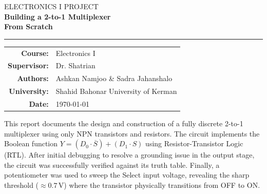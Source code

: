 \documentclass[11pt,a4paper]{article}
\begin{document}
\begin{titlepage}
\begin{center}

\vspace*{1.5cm}

{\Large\sffamily\textcolor{secondary}{ELECTRONICS I PROJECT}}\\[1cm]

{\Huge\bfseries\textcolor{primary}{Building a 2-to-1 Multiplexer}}\\[0.25cm]
{\Huge\bfseries\textcolor{primary}{From Scratch }}\\[0.25cm]

\vspace{1.2cm}

\textcolor{accent}{\rule{0.7\textwidth}{1.5pt}}

\vspace{1cm}

\vspace{2cm}

\begin{tabular}{rl}
\\
\textbf{Course:} & Electronics I \\
\textbf{Supervisor:} & Dr. Shatrian \\
\textbf{Authors:} & Ashkan Namjoo \quad \& \quad Sadra Jahanshalo \\
\textbf{University:} & Shahid Bahonar University of Kerman \\
\textbf{Date:} & \today \\
\end{tabular}

\vfill


\end{center}
\end{titlepage}


\begin{tcolorbox}[
  enhanced, colback=lightgray, colframe=primary, arc=0mm, boxrule=1pt,
  left=12pt, right=12pt, top=10pt, bottom=10pt,
  title={\large\bfseries\sffamily Abstract},
  fonttitle=\color{white}, coltitle=white,
  attach boxed title to top left={yshift=-4mm, xshift=8mm},
  boxed title style={colback=primary, arc=0mm}
]
This report documents the design and construction of a fully discrete 2-to-1 multiplexer using only NPN transistors and resistors. The circuit implements the Boolean function $Y = (D_0 \cdot \overline{S}) + (D_1 \cdot S)$ using Resistor-Transistor Logic (RTL). After initial debugging to resolve a grounding issue in the output stage, the circuit was successfully verified against its truth table. Finally, a potentiometer was used to sweep the Select input voltage, revealing the sharp threshold ($\approx 0.7\,\text{V}$) where the transistor physically transitions from OFF to ON.
\end{tcolorbox}
\end{document}
